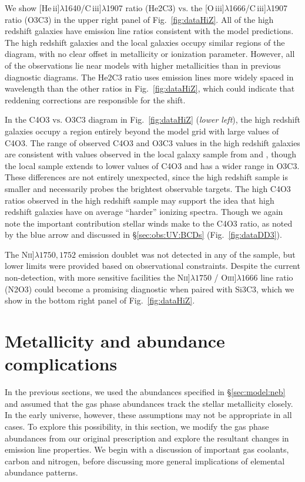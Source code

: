 \documentclass[preprint2]{aastex61}
\newcommand{\oiii}{[O\,{\sc iii}]\xspace}
\newcommand{\heii}{[He\,{\sc ii}]\xspace}
\newcommand{\ciii}{C\,{\sc iii}]\xspace}
\newcommand\vs{\ensuremath{\mathrm{vs.}}\xspace}
\begin{document}
We show \heii$\lambda$1640/\ciii$\lambda$1907 ratio (He2C3) \vs the \oiii$\lambda$1666/\ciii$\lambda$1907 ratio (O3C3) in the upper right panel of Fig.~\ref{fig:dataHiZ}. All of the high redshift galaxies have emission line ratios consistent with the model predictions. The high redshift galaxies and the local galaxies occupy similar regions of the diagram, with no clear offset in metallicity or ionization parameter. However, all of the observations lie near models with higher metallicities than in previous diagnostic diagrams. The He2C3 ratio uses emission lines more widely spaced in wavelength than the other ratios in Fig.~\ref{fig:dataHiZ}, which could indicate that reddening corrections are responsible for the shift.

In the C4O3 \vs O3C3 diagram in Fig.~\ref{fig:dataHiZ} (\emph{lower left}), the high redshift galaxies occupy a region entirely beyond the model grid with large values of C4O3. The range of observed C4O3 and O3C3 values in the high redshift galaxies are consistent with values observed in the local galaxy sample from \citet{Berg+2016} and \citet{Senchyna+2017}, though the local sample extends to lower values of C4O3 and has a wider range in O3C3. These differences are not entirely unexpected, since the high redshift sample is smaller and necessarily probes the brightest observable targets. The high C4O3 ratios observed in the high redshift sample may support the idea that high redshift galaxies have on average ``harder'' ionizing spectra. Though we again note the important contribution stellar winds make to the C4O3 ratio, as noted by the blue arrow and discussed in \S\ref{sec:obs:UV:BCDs} (Fig.~\ref{fig:dataDD3}).

The N\textsc{ii}]$\lambda1750,1752$ emission doublet was not detected in any of the \citet{Stark+2014} sample, but lower limits were provided based on observational constraints. Despite the current non-detection, with more sensitive facilities the N\textsc{ii}]$\lambda1750$ / O\textsc{iii}]$\lambda1666$ line ratio (N2O3) could become a promising diagnostic when paired with Si3C3, which we show in the bottom right panel of Fig.~\ref{fig:dataHiZ}.
\section{Metallicity and abundance complications} \label{sec:gasZ}

In the previous sections, we used the abundances specified in \S\ref{sec:model:neb} and assumed that the gas phase abundances track the stellar metallicity closely. In the early universe, however, these assumptions may not be appropriate in all cases. To explore this possibility, in this section, we modify the gas phase abundances from our original prescription and explore the resultant changes in emission line properties. We begin with a discussion of important gas coolants, carbon and nitrogen, before discussing more general implications of elemental abundance patterns.
\end{document}
